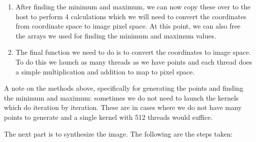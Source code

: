 \begin{enumerate}
	\item After finding the minimum and maximum, we can now copy these over to the host to perform 4 calculations which we will need to convert the coordinates from coordinate space to image pixel space. At this point, we can also free the arrays we used for finding the minimum and maximum values.
	
	\item The final function we need to do is to convert the coordinates to image space. To do this we launch as many threads as we have points and each thread does a simple multiplication and addition to map to pixel space.
\end{enumerate}

A note on the methods above, specifically for generating the points and finding the minimum and maximum: sometimes we do not need to launch the kernels which do iteration by iteration. These are in cases where we do not have many points to generate and a single kernel with 512 threads would suffice.

The next part is to synthesize the image. The following are the steps taken:

